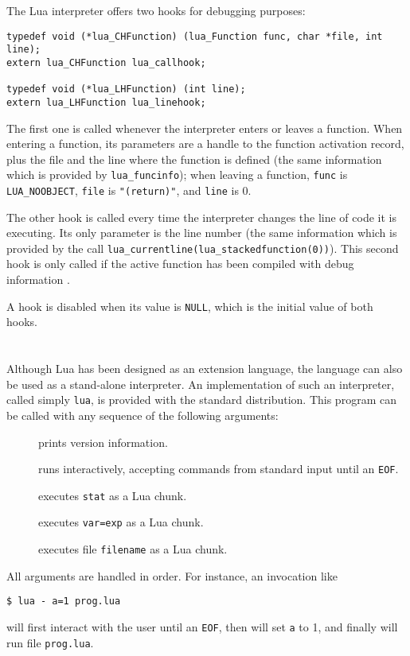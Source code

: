 The Lua interpreter offers two hooks for debugging purposes:
\begin{verbatim}
typedef void (*lua_CHFunction) (lua_Function func, char *file, int line);
extern lua_CHFunction lua_callhook;

typedef void (*lua_LHFunction) (int line);
extern lua_LHFunction lua_linehook;
\end{verbatim}
The first one is called whenever the interpreter enters or leaves a
function.
When entering a function,
its parameters are a handle to the function activation record,
plus the file and the line where the function is defined (the same
information which is provided by \verb|lua_funcinfo|);
when leaving a function, \verb|func| is \verb|LUA_NOOBJECT|,
\verb|file| is \verb|"(return)"|, and \verb|line| is 0.

The other hook is called every time the interpreter changes
the line of code it is executing.
Its only parameter is the line number
(the same information which is provided by the call
\verb|lua_currentline(lua_stackedfunction(0))|).
This second hook is only called if the active function
has been compiled with debug information .

A hook is disabled when its value is \verb|NULL|,
which is the initial value of both hooks.



\section{} \label{lua-sa}

Although Lua has been designed as an extension language,
the language can also be used as a stand-alone interpreter.
An implementation of such an interpreter,
called simply \verb|lua|,
is provided with the standard distribution.
This program can be called with any sequence of the following arguments:
\begin{description}
\item[] prints version information.
\item[\T{-}] runs interactively, accepting commands from standard input
until an \verb|EOF|.
\item[] executes \verb|stat| as a Lua chunk.
\item[] executes \verb|var=exp| as a Lua chunk.
\item[] executes file \verb|filename| as a Lua chunk.
\end{description}
All arguments are handled in order.
For instance, an invocation like
\begin{verbatim}
$ lua - a=1 prog.lua
\end{verbatim}
will first interact with the user until an \verb|EOF|,
then will set \verb|a| to 1,
and finally will run file \verb|prog.lua|.


